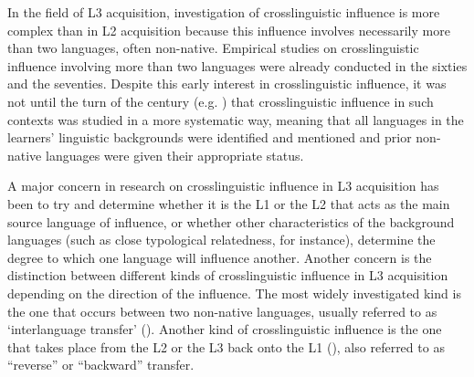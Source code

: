\documentclass[output=paper,colorlinks,citecolor=brown,nonflat]{langsci/langscibook}
\begin{document}
In the field of L3 acquisition, investigation of crosslinguistic influence is more complex than in L2 acquisition because this influence involves necessarily more than two languages, often non-native. Empirical studies on crosslinguistic influence involving more than two languages were already conducted in the sixties and the seventies. Despite this early interest in crosslinguistic influence, it was not until the turn of the century (e.g. \citealt{WilliamsHammarberg1998, CenozEtAl2001}) that crosslinguistic influence in such contexts was studied in a more systematic way, meaning that all languages in the learners’ linguistic backgrounds were identified and mentioned and prior non-native languages were given their appropriate status.

A major concern in research on crosslinguistic influence in L3 acquisition has been to try and determine whether it is the L1 or the L2 that acts as the main source language of influence, or whether other characteristics of the background languages (such as close typological relatedness, for instance), determine the degree to which one language will influence another. Another concern is the distinction between different kinds of crosslinguistic influence in L3 acquisition depending on the direction of the influence. The most widely investigated kind is the one that occurs between two non-native languages, usually referred to as ‘interlanguage transfer’ (\citealt{DeAngelisSelinker2001}). Another kind of crosslinguistic influence is the one that takes place from the L2 or the L3 back onto the L1 (\citealt{KecskesPapp2000}), also referred to as “reverse” or “backward” transfer.
\end{document}
